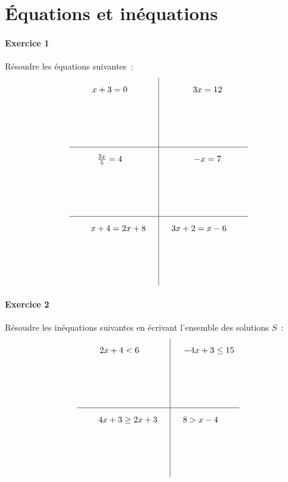 \documentclass[a4paper]{article}
\begin{document}
  \section*{Équations et inéquations}
  \paragraph{Exercice 1}
  Résoudre les équations suivantes~:
  \[
    \def\arraystretch{2}
    \begin{array}{c|c}
      x + 3 = 0 \quad&\quad 3x = 12\\[2cm]
      \hline
      \frac{2x}{5} = 4 \quad&\quad -x = 7\\[2cm]
      \hline
      \quad\quad x + 4 = 2x + 8 \quad&\quad 3x + 2 = x - 6 \quad\quad\\[2cm]
    \end{array}
  \]

  \paragraph{Exercice 2}
  Résoudre les inéquations suivantes en écrivant l'ensemble des solutions $S$~:
  \[
    \def\arraystretch{2}
    \begin{array}{c|c}
      2x + 4 < 6 \quad&\quad -4x + 3 \leq 15\\[2cm]
      \hline
      \quad\quad 4x + 3 \geq 2x + 3 \quad&\quad 8 > x - 4 \quad\quad\\[2cm]
    \end{array}
  \]
\end{document}
